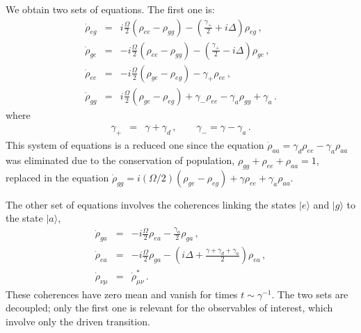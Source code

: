 \documentclass[twocolumn,aps,eqsecnum,showkeys,amsmath]{revtex4-2}
\begin{document}
We obtain two sets of equations. The first one is:  
%
\begin{eqnarray} 	\label{eq:dotrho_jk}
\dot{\rho}_{eg} &=& i\frac{\Omega}{2} (\rho_{ee} -\rho_{gg})
 -\left( \frac{\gamma_+}{2}  +i\Delta \right) \rho_{eg} \,, \\
%
\dot{\rho}_{ge} &=& -i\frac{\Omega}{2} (\rho_{ee} -\rho_{gg})
 -\left( \frac{\gamma_+}{2}  -i\Delta \right) \rho_{ge} 	\,,
 	\nonumber 	\\
%
\dot{\rho}_{ee} &=& -i\frac{\Omega}{2} (\rho_{ge} -\rho_{eg})
 	-\gamma_+ \rho_{ee} 	\,,	\nonumber 	\\
%
\dot{\rho}_{gg} &=& i\frac{\Omega}{2} (\rho_{ge} -\rho_{eg})  
	+\gamma_- \rho_{ee} -\gamma_a \rho_{gg} 
	+\gamma_a \,.	 	\nonumber 	
\end{eqnarray}
where
%
\begin{eqnarray}
\gamma_+ &=& \gamma + \gamma_d \,, 	\qquad 
\gamma_- = \gamma - \gamma_a \,.
\end{eqnarray}
This system of equations is a reduced one since the equation 
$\dot{\rho}_{aa} = \gamma_d \rho_{ee} -\gamma_a \rho_{aa}$ was 
eliminated due to the conservation of population, 
$\rho_{gg} +\rho_{ee} +\rho_{aa} =1$, replaced in the equation 
$\dot{\rho}_{gg} = i (\Omega/2) (\rho_{ge} -\rho_{eg})  
	+\gamma \rho_{ee} +\gamma_a \rho_{aa}$.

The other set of equations involves the coherences linking the states 
$|e \rangle$ and $|g \rangle$ to the state $|a \rangle$, 
%
\begin{eqnarray}
\dot{\rho}_{ga} &=& -i\frac{\Omega}{2} \rho_{ea} 
	-\frac{\gamma_a}{2} \rho_{ga} 	\,, 	\nonumber \\
\dot{\rho}_{ea} &=& -i\frac{\Omega}{2} \rho_{ga} -\left( i\Delta 
	+\frac{\gamma +\gamma_d +\gamma_a}{2}  \right) \rho_{ea} \,, 
	\nonumber \\
\dot{\rho}_{\nu \mu} &=& \dot{\rho}_{\mu \nu}^{\ast} 	\,.
\end{eqnarray}
These coherences have zero mean and vanish for times 
$t \sim \gamma^{-1}$. The two sets are decoupled; only the first one 
is relevant for the observables of interest, which involve only the driven 
transition. 
\end{document}

